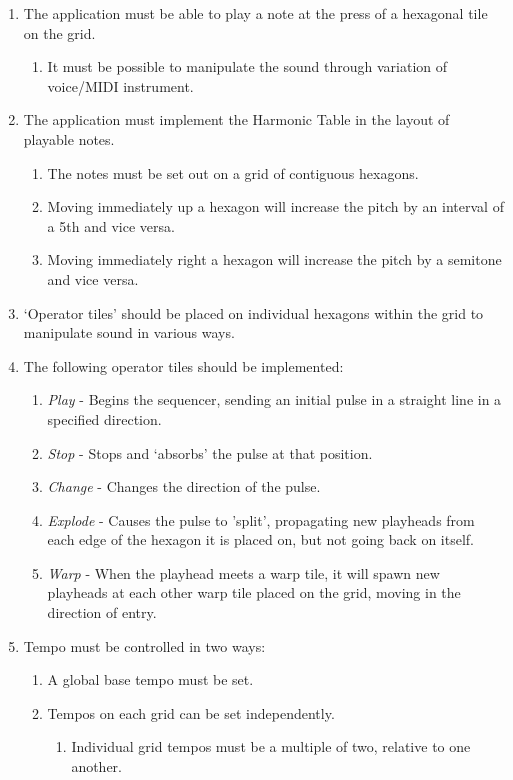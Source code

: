 \documentclass[10pt,a4paper]{article}
\begin{document}
\begin{enumerate}

\item The application must be able to play a note at the press of a hexagonal tile on the grid.
\begin{enumerate}
\item It must be possible to manipulate the sound through variation of voice/MIDI instrument.
\end{enumerate}

\item The application must implement the Harmonic Table in the layout of playable notes.
\begin{enumerate}
\item The notes must be set out on a grid of contiguous hexagons.
\item Moving immediately up a hexagon will increase the pitch by an interval of a 5th and vice versa.
\item Moving immediately right a hexagon will increase the pitch by a semitone and vice versa.
\end{enumerate}

\item `Operator tiles' should be placed on individual hexagons within the grid to manipulate sound in various ways.

\item The following operator tiles should be implemented:
\begin{enumerate}
\item \textit{Play} - Begins the sequencer, sending an initial pulse in a straight line in a specified direction.
\item \textit{Stop} - Stops and `absorbs' the pulse at that position.
\item \textit{Change} - Changes the direction of the pulse.
\item \textit{Explode} - Causes the pulse to 'split', propagating new playheads from each edge of the hexagon it is placed on, but not going back on itself.
\item \textit{Warp} - When the playhead meets a warp tile, it will spawn new playheads at each other warp tile placed on the grid, moving in the direction of entry. 
\end{enumerate}

\item Tempo must be controlled in two ways:
\begin{enumerate}
\item A global base tempo must be set.
\item Tempos on each grid can be set independently.
\begin{enumerate}
\item Individual grid tempos must be a multiple of two, relative to one another.
\end{enumerate}
\end{enumerate}


\end{enumerate}
\end{document}
